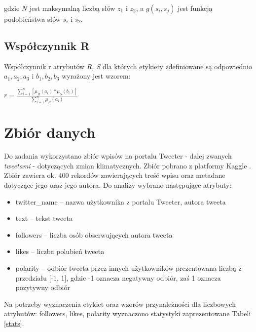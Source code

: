 \documentclass{classrep}
\begin{document}
gdzie $N$ jest maksymalną liczbą słów $z_1$ i $z_2$, a $g(s_i, s_j)$ jest funkcją podobieństwa słów $s_i$ i $s_2$.

\subsection{Współczynnik R}

Współczynnik r atrybutów \textit{R, S} dla których etykiety zdefiniowane są odpowiednio $a_1, a_2, a_3$ i $b_1, b_2, b_3$  wyrażony jest wzorem:
\begin{center}
$r = \frac{ \sum\nolimits_{i=1}^{n} [ \mu_R (a_i) * \mu_S (b_i)]}{\sum\nolimits_{i=1}^{n} \mu_R (a_i)}$
\end{center}

\section{Zbiór danych}

Do zadania wykorzystano zbiór wpisów na portalu Tweeter - dalej zwanych \textit{tweetami} - dotyczących zmian klimatycznych. Zbiór pobrano z platformy Kaggle \cite{db}. Zbiór zawiera ok. 400 rekordów zawierających treść wpisu oraz metadane dotyczące jego oraz jego autora. Do analizy wybrano następujące atrybuty:

\begin{itemize}
    \item twitter\_name -- nazwa użytkownika z portalu Tweeter, autora tweeta
    \item text -- tekst tweeta
    \item followers -- liczba osób obserwujących autora tweeta
    \item likes -- liczba polubień tweeta
    \item polarity -- odbiór tweeta przez innych użytkowników prezentowana liczbą z przedziału [-1, 1], gdzie -1 oznacza negatywny odbiór, zaś 1 oznacza pozytywny odbiór
\end{itemize}

Na potrzeby wyznaczenia etykiet oraz wzorów przynależności dla liczbowych atrybutów: followers, likes, polarity wyznaczono statystyki zaprezentowane Tabeli \ref{stats}.
\end{document}
